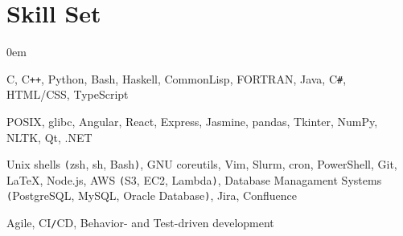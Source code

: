 \documentclass[11pt]{article}
\begin{document}
\vspace*{-10pt}
\section*{Skill Set}
\vspace*{-8pt}\hspace*{10pt}\begin{minipage}{0.935\textwidth}
    \begin{description}
        \itemsep0em
        \raggedright
        \item[Languages] C, C\texttt{++}, Python, Bash, Haskell, CommonLisp, FORTRAN, Java, C\texttt{\#}, HTML/CSS, TypeScript
        \item[Frameworks\texttt{/}Libraries] POSIX, glibc, Angular, React, Express, Jasmine, pandas, Tkinter, NumPy, NLTK,
            Qt, .NET
        \item[Tools] Unix shells \texttt{(}zsh, sh, Bash\texttt{)}, GNU coreutils, Vim, Slurm, cron, PowerShell, Git, \LaTeX, Node.js,
            AWS \texttt{(}S3, EC2, Lambda\texttt{)}, Database Managament Systems \texttt{(}PostgreSQL, MySQL, Oracle
            Database\texttt{)}, Jira, Confluence
        \item[Methodologies] Agile, CI\texttt{/}CD, Behavior- and Test-driven development
    \end{description}
\end{minipage}

\vspace*{-10pt}
\end{document}
